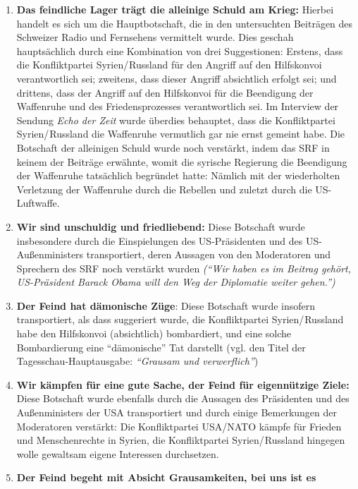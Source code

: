 \begin{enumerate}
\def\labelenumi{\arabic{enumi}.}
\tightlist
\item
  \textbf{Das feindliche Lager trägt die alleinige Schuld am Krieg:}
  Hierbei handelt es sich um die Hauptbotschaft, die in den untersuchten
  Beiträgen des Schweizer Radio und Fernsehens vermittelt wurde. Dies
  geschah hauptsächlich durch eine Kombination von drei Suggestionen:
  Erstens, dass die Konfliktpartei Syrien/ Russland für den Angriff auf
  den Hilfskonvoi verantwortlich sei; zweitens, dass dieser Angriff
  absichtlich erfolgt sei; und drittens, dass der Angriff auf den
  Hilfskonvoi für die Beendigung der Waffenruhe und des
  Friedensprozesses verantwortlich sei. Im Interview der Sendung
  \emph{Echo der Zeit} wurde überdies behauptet, dass die Konfliktpartei
  Syrien/ Russland die Waffenruhe vermutlich gar nie ernst gemeint habe.
  Die Botschaft der alleinigen Schuld wurde noch verstärkt, indem das
  SRF in keinem der Beiträge erwähnte, womit die syrische Regierung die
  Beendigung der Waffenruhe tatsächlich begründet hatte: Nämlich mit der
  wiederholten Verletzung der Waffenruhe durch die Rebellen und zuletzt
  durch die US-Luftwaffe.
\item
  \textbf{Wir sind unschuldig und friedliebend:} Diese Botschaft wurde
  insbesondere durch die Einspielungen des US-Präsidenten und des
  US-Außenministers transportiert, deren Aussagen von den Moderatoren
  und Sprechern des SRF noch verstärkt wurden \emph{(``Wir haben es im
  Beitrag gehört, US-Präsident Barack Obama will den Weg der Diplomatie
  weiter gehen.'')}
\item
  \textbf{Der Feind hat dämonische Züge}: Diese Botschaft wurde insofern
  transportiert, als dass suggeriert wurde, die Konfliktpartei
  Syrien/ Russland habe den Hilfskonvoi (absichtlich) bombardiert, und
  eine solche Bombardierung eine ``dämonische'' Tat darstellt (vgl. den
  Titel der Tagesschau-Hauptausgabe: \emph{``Grausam und verwerflich''})
\item
  \textbf{Wir kämpfen für eine gute Sache, der Feind für eigennützige
  Ziele:} Diese Botschaft wurde ebenfalls durch die Aussagen des
  Präsidenten und des Außenministers der USA transportiert und durch
  einige Bemerkungen der Moderatoren verstärkt: Die Konfliktpartei
  USA/NATO kämpfe für Frieden und Menschenrechte in Syrien, die
  Konfliktpartei Syrien/ Russland hingegen wolle gewaltsam eigene
  Interessen durchsetzen.
\item
  \textbf{Der Feind begeht mit Absicht Grausamkeiten, bei uns ist es
}
\end{enumerate}
